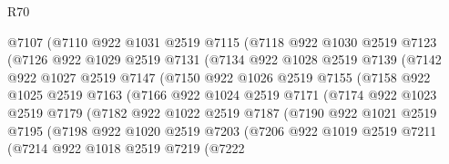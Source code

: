 \begin{lexlean}{R70}
\begin{coremodule}
                @7107
                (@7110
                  @922
                  @1031
                  @2519
                  @7115
                  (@7118
                    @922
                    @1030
                    @2519
                    @7123
                    (@7126
                      @922
                      @1029
                      @2519
                      @7131
                      (@7134
                        @922
                        @1028
                        @2519
                        @7139
                        (@7142
                          @922
                          @1027
                          @2519
                          @7147
                          (@7150
                            @922
                            @1026
                            @2519
                            @7155
                            (@7158
                              @922
                              @1025
                              @2519
                              @7163
                              (@7166
                                @922
                                @1024
                                @2519
                                @7171
                                (@7174
                                  @922
                                  @1023
                                  @2519
                                  @7179
                                  (@7182
                                    @922
                                    @1022
                                    @2519
                                    @7187
                                    (@7190
                                      @922
                                      @1021
                                      @2519
                                      @7195
                                      (@7198
                                        @922
                                        @1020
                                        @2519
                                        @7203
                                        (@7206
                                          @922
                                          @1019
                                          @2519
                                          @7211
                                          (@7214
                                            @922
                                            @1018
                                            @2519
                                            @7219
                                            (@7222

\end{coremodule}
\end{lexlean}
